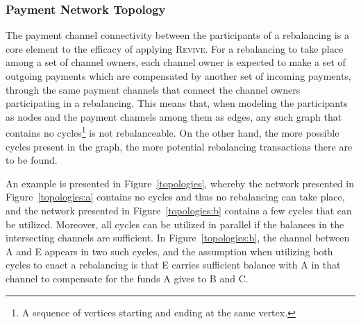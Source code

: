 \documentclass[sigconf]{acmart}
\newcommand{\name}{\textsc{Revive}\xspace}
\begin{document}
\subsubsection{Payment Network Topology}
The payment channel connectivity between the participants of a rebalancing is a core element to the efficacy of applying \name.
For a rebalancing to take place among a set of channel owners, each channel owner is expected to make a set of outgoing payments which are compensated by another set of incoming payments, through the same payment channels that connect the channel owners participating in a rebalancing.
This means that, when modeling the participants as nodes and the payment channels among them as edges, any such graph that contains no cycles\footnote{A sequence of vertices starting and ending at the same vertex.} is not rebalanceable. On the other hand, the more possible cycles present in the graph, the more potential rebalancing transactions there are to be found.

An example is presented in Figure~\ref{topologies}, whereby the network presented in Figure~\ref{topologies:a} contains no cycles and thus no rebalancing can take place, and the network presented in Figure~\ref{topologies:b} contains a few cycles that can be utilized. Moreover, all cycles can be utilized in parallel if the balances in the intersecting channels are sufficient. In Figure~\ref{topologies:b}, the channel between A and E appears in two such cycles, and the assumption when utilizing both cycles to enact a rebalancing is that E carries sufficient balance with A in that channel to compensate for the funds A gives to B and C.
\end{document}
